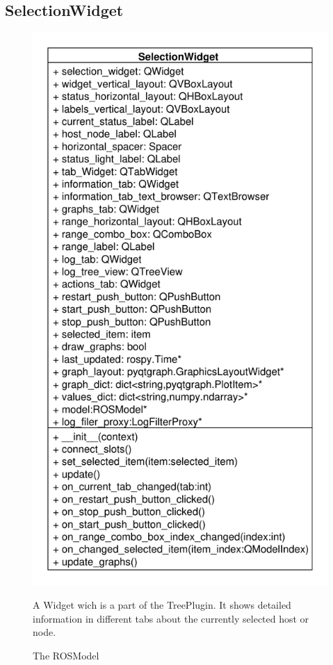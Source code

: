 \newpage
\subsection{SelectionWidget}
\begin{figure}[htbp]
	\begin{minipage}[t]{7cm}
		\vspace{0pt}
		\centering
		\includegraphics[scale=0.6]{./diagram_pictures/Selection.pdf}
		\caption{The ROSModel}
	\end{minipage}
	\hfill
	\begin{minipage}[t]{6.5cm}
		\vspace{10pt}
		A Widget wich is a part of the TreePlugin. It shows detailed information
		in different tabs about the currently selected host or node.
	\end{minipage}
\end{figure} 
